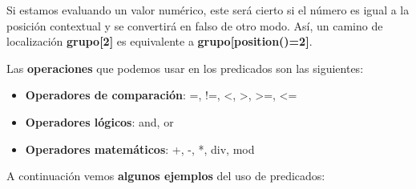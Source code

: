 Si estamos evaluando un valor numérico, este será cierto si el número es igual a la posición contextual y se convertirá en falso de otro modo. Así, un camino de localización \textbf{grupo[2]} es equivalente a \textbf{grupo[position()=2]}.

Las \textbf{operaciones} que podemos usar en los predicados son las siguientes:

\begin{itemize}
    \item \textbf{Operadores de comparación}: =, !=, <, >, >=, <=
    \item \textbf{Operadores lógicos}: and, or
    \item \textbf{Operadores matemáticos}: +, -, *, div, mod
\end{itemize}

A continuación vemos \textbf{algunos ejemplos} del uso de predicados:

